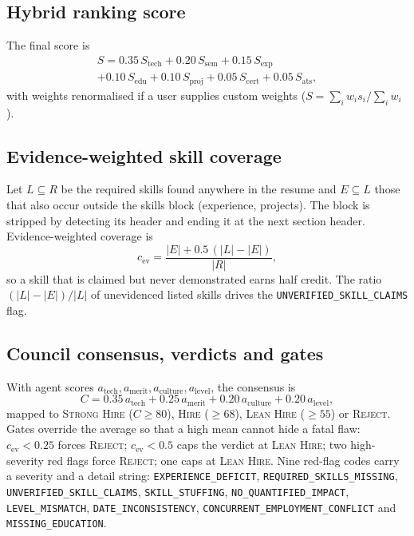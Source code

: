 \documentclass[conference]{IEEEtran}
\newcommand{\verd}[1]{\textsc{#1}}
\newcommand{\flag}[1]{\texttt{\footnotesize #1}}
\newcommand{\Sstrong}{\verd{Strong Hire}}
\newcommand{\Shire}{\verd{Hire}}
\newcommand{\Slean}{\verd{Lean Hire}}
\newcommand{\Sreject}{\verd{Reject}}
\begin{document}
\subsection{Hybrid ranking score}
The final score is
\begin{multline}
S = 0.35\,S_{\mathrm{tech}} + 0.20\,S_{\mathrm{sem}} + 0.15\,S_{\mathrm{exp}} \\
 + 0.10\,S_{\mathrm{edu}} + 0.10\,S_{\mathrm{proj}} + 0.05\,S_{\mathrm{cert}} + 0.05\,S_{\mathrm{ats}},
\label{eq:rank}
\end{multline}
with weights renormalised if a user supplies custom weights ($S=\sum_i w_i s_i / \sum_i w_i$).

\subsection{Evidence-weighted skill coverage}
Let $L\subseteq R$ be the required skills found anywhere in the resume and $E\subseteq L$ those that also occur outside the skills block (experience, projects). The block is stripped by detecting its header and ending it at the next section header. Evidence-weighted coverage is
\begin{equation}
c_{\mathrm{ev}} = \frac{|E| + 0.5\,(|L|-|E|)}{|R|},
\label{eq:cev}
\end{equation}
so a skill that is claimed but never demonstrated earns half credit. The ratio $(|L|-|E|)/|L|$ of unevidenced listed skills drives the \flag{UNVERIFIED\_SKILL\_CLAIMS} flag.

\subsection{Council consensus, verdicts and gates}
With agent scores $a_{\mathrm{tech}}, a_{\mathrm{merit}}, a_{\mathrm{culture}}, a_{\mathrm{level}}$, the consensus is
\begin{equation}
C = 0.35\,a_{\mathrm{tech}} + 0.25\,a_{\mathrm{merit}} + 0.20\,a_{\mathrm{culture}} + 0.20\,a_{\mathrm{level}},
\label{eq:consensus}
\end{equation}
mapped to \Sstrong{} ($C\ge80$), \Shire{} ($\ge68$), \Slean{} ($\ge55$) or \Sreject{}. Gates override the average so that a high mean cannot hide a fatal flaw: $c_{\mathrm{ev}}<0.25$ forces \Sreject{}; $c_{\mathrm{ev}}<0.5$ caps the verdict at \Slean{}; two high-severity red flags force \Sreject{}; one caps at \Slean{}. Nine red-flag codes carry a severity and a detail string: \flag{EXPERIENCE\_DEFICIT}, \flag{REQUIRED\_SKILLS\_MISSING}, \flag{UNVERIFIED\_SKILL\_CLAIMS}, \flag{SKILL\_STUFFING}, \flag{NO\_QUANTIFIED\_IMPACT}, \flag{LEVEL\_MISMATCH}, \flag{DATE\_INCONSISTENCY}, \flag{CONCURRENT\_EMPLOYMENT\_CONFLICT} and \flag{MISSING\_EDUCATION}.
\end{document}
